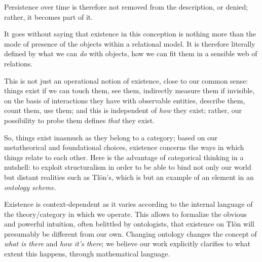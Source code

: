 Persistence over time is therefore not removed from the description, or denied; rather, it becomes part of it.%

It goes without saying that existence in this conception is nothing more than the mode of presence of the objects within a relational model. It is therefore literally defined by what we can \emph{do} with objects, how we can fit them in a sensible web of relations.

This is not just an operational notion of existence, close to our common sense: things exist if we can touch them, see them, indirectly measure them if invisible, on the basis of interactions they have with observable entities, describe them, count them, use them; and this is independent of \emph{how} they exist; rather, our possibility to probe them defines \emph{that} they exist.

So, things exist inasmuch as they belong to a category; based on our metatheorical and foundational choices, existence concerns the ways in which things relate to each other. Here is the advantage of categorical thinking in a nutshell: to exploit structuralism in order to be able to bind not only our world but distant realities such as Tl\"on's, which is but an example of an element in an \emph{ontology scheme}.

Existence is context-dependent as it varies according to the internal language of the theory/category in which we operate. This allows to formalize the obvious and powerful intuition, often belittled by ontologists, that existence on Tl\"on will presumably be different from our own. Changing ontology changes the concept of \emph{what is there} and \emph{how it's there}; we believe our work explicitly clarifies to what extent this happens, through mathematical language.
